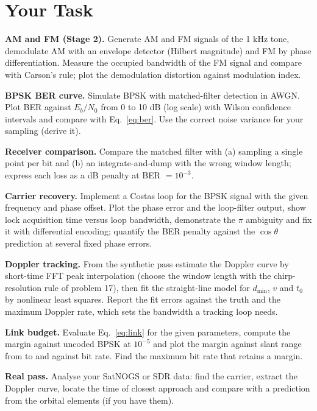 \documentclass[11pt,a4paper]{article}
\begin{document}
\section*{Your Task}
\begin{tasks}
  \item \textbf{AM and FM (Stage 2).} Generate AM and FM signals of the 1 kHz tone, demodulate AM with an envelope detector (Hilbert magnitude) and FM by phase differentiation. Measure the occupied bandwidth of the FM signal and compare with Carson's rule; plot the demodulation distortion against modulation index.
  \item \textbf{BPSK BER curve.} Simulate BPSK with matched-filter detection in AWGN. Plot BER against $E_b/N_0$ from 0 to 10 dB (log scale) with Wilson confidence intervals and compare with Eq.~\eqref{eq:ber}. Use the correct noise variance for your sampling (derive it).
  \item \textbf{Receiver comparison.} Compare the matched filter with (a) sampling a single point per bit and (b) an integrate-and-dump with the wrong window length; express each loss as a dB penalty at BER $=10^{-3}$.
  \item \textbf{Carrier recovery.} Implement a Costas loop for the BPSK signal with the given frequency and phase offset. Plot the phase error and the loop-filter output, show lock acquisition time versus loop bandwidth, demonstrate the $\pi$ ambiguity and fix it with differential encoding; quantify the BER penalty against the $\cos\theta$ prediction at several fixed phase errors.
  \item \textbf{Doppler tracking.} From the synthetic pass estimate the Doppler curve by short-time FFT peak interpolation (choose the window length with the chirp-resolution rule of problem 17), then fit the straight-line model for $d_{\min}$, $v$ and $t_0$ by nonlinear least squares. Report the fit errors against the truth and the maximum Doppler rate, which sets the bandwidth a tracking loop needs.
  \item \textbf{Link budget.} Evaluate Eq.~\eqref{eq:link} for the given parameters, compute the margin against uncoded BPSK at $10^{-5}$ and plot the margin against slant range from  to  and against bit rate. Find the maximum bit rate that retains a  margin.
  \item \textbf{Real pass.} Analyse your SatNOGS or SDR data: find the carrier, extract the Doppler curve, locate the time of closest approach and compare with a prediction from the orbital elements (if you have them).
\end{tasks}
\end{document}
